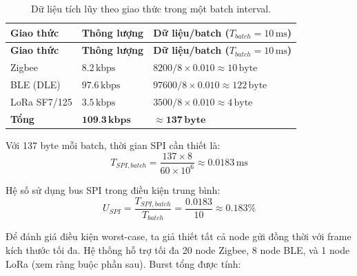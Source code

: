         \begin{longtable}{|p{3cm}|p{4cm}|p{6.5cm}|}
            \caption{Dữ liệu tích lũy theo giao thức trong một batch interval.} \label{tab:batch_data} \\
            \hline
            \textbf{Giao thức} & \textbf{Thông lượng} & \textbf{Dữ liệu/batch ($T_{batch} = 10\,\text{ms}$)} \\ \hline
            \endfirsthead
            \hline
            \textbf{Giao thức} & \textbf{Thông lượng} & \textbf{Dữ liệu/batch ($T_{batch} = 10\,\text{ms}$)} \\ \hline
            \endhead
            \hline
            \endfoot
            \endlastfoot
            Zigbee     & $8{.}2\,\text{kbps}$   & $8200 / 8 \times 0{.}010 \approx 10\,\text{byte}$   \\ \hline
            BLE (DLE)  & $97{.}6\,\text{kbps}$  & $97600 / 8 \times 0{.}010 \approx 122\,\text{byte}$ \\ \hline
            LoRa SF7/125 & $3{.}5\,\text{kbps}$ & $3500 / 8 \times 0{.}010 \approx 4\,\text{byte}$    \\ \hline
            \textbf{Tổng} & $\mathbf{109{.}3\,\text{kbps}}$ & $\mathbf{\approx 137\,\text{byte}}$ \\ \hline
        \end{longtable}
        
        Với 137 byte mỗi batch, thời gian SPI cần thiết là:
        \[ T_{SPI,batch} = \dfrac{137 \times 8}{60 \times 10^6} \approx 0{.}0183\,\text{ms} \]
        
        Hệ số sử dụng bus SPI trong điều kiện trung bình:
        \[ U_{SPI} = \dfrac{T_{SPI,batch}}{T_{batch}} = \dfrac{0{.}0183}{10} \approx 0{.}183\% \]
        
        Để đánh giá điều kiện worst-case, ta giả thiết tất cả node gửi đồng thời với frame kích thước tối đa. Hệ thống hỗ trợ tối đa 20 node Zigbee, 8 node BLE, và 1 node LoRa (xem ràng buộc phần sau). Burst tổng được tính:
        

